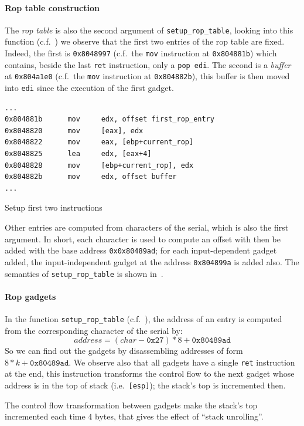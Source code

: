 \documentclass{easychair}
\begin{document}
\paragraph{Rop table construction}
The \emph{rop table} is also the second argument of \texttt{setup\_rop\_table}, looking into this function (c.f.~) we observe that the first two entries of the rop table are fixed. Indeed, the first is \texttt{0x8048997} (c.f.~the \texttt{mov} instruction at \texttt{0x804881b}) which contains, beside the last \texttt{ret} instruction, only a \texttt{pop edi}. The second is a \emph{buffer} at \texttt{0x804a1e0} (c.f.~the \texttt{mov} instruction at \texttt{0x804882b}), this buffer is then moved into \texttt{edi} since the execution of the first gadget.

\begin{listing}
  \begin{verbatim}
...
0x804881b      mov     edx, offset first_rop_entry
0x8048820      mov     [eax], edx
0x8048822      mov     eax, [ebp+current_rop]
0x8048825      lea     edx, [eax+4]
0x8048828      mov     [ebp+current_rop], edx
0x804882b      mov     edx, offset buffer
...
  \end{verbatim}
  \caption{Setup first two instructions}
  \label{lst:setup_first_twos}
\end{listing}

Other entries are computed from characters of the serial, which is also the first argument. In short, each character is used to compute an offset with then be added with the base address \texttt{0x0x80489ad}; for each input-dependent gadget added, the input-independent gadget at the address \texttt{0x804899a} is added also. The semantics of \texttt{setup\_rop\_table} is shown in~.

\paragraph{Rop gadgets}
In the function \texttt{setup\_rop\_table} (c.f.~), the address of an entry is computed from the corresponding character of the serial by:
\begin{equation}
  address = (char - \mathtt{0x27}) * 8 + \mathtt{0x80489ad} \label{equ:gadget_address}
\end{equation}
So we can find out the gadgets by disassembling addresses of form $8 * k + \mathtt{0x80489ad}$. We observe also that all gadgets have a single \texttt{ret} instruction at the end, this instruction transforms the control flow to the next gadget whose address is in the top of stack (i.e.~\texttt{[esp]}); the stack's top is incremented then. 
\begin{remark}
  The control flow transformation between gadgets make the stack's top incremented each time $4$ bytes, that gives the effect of ``stack unrolling''.
\end{remark}
\end{document}
